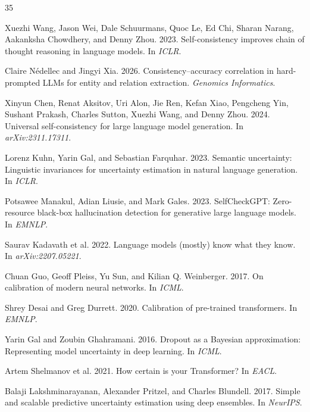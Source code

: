 \documentclass[11pt,a4paper]{article}
\begin{document}
\begin{thebibliography}{35}

Xuezhi Wang, Jason Wei, Dale Schuurmans, Quoc Le, Ed Chi, Sharan Narang, Aakanksha Chowdhery, and Denny Zhou. 2023.
Self-consistency improves chain of thought reasoning in language models.
In \emph{ICLR}.

Claire N\'{e}dellec and Jingyi Xia. 2026.
Consistency--accuracy correlation in hard-prompted LLMs for entity and relation extraction.
\emph{Genomics Informatics}.

Xinyun Chen, Renat Aksitov, Uri Alon, Jie Ren, Kefan Xiao, Pengcheng Yin, Sushant Prakash, Charles Sutton, Xuezhi Wang, and Denny Zhou. 2024.
Universal self-consistency for large language model generation.
In \emph{arXiv:2311.17311}.

Lorenz Kuhn, Yarin Gal, and Sebastian Farquhar. 2023.
Semantic uncertainty: Linguistic invariances for uncertainty estimation in natural language generation.
In \emph{ICLR}.

Potsawee Manakul, Adian Liusie, and Mark Gales. 2023.
SelfCheckGPT: Zero-resource black-box hallucination detection for generative large language models.
In \emph{EMNLP}.

Saurav Kadavath et al. 2022.
Language models (mostly) know what they know.
In \emph{arXiv:2207.05221}.

Chuan Guo, Geoff Pleiss, Yu Sun, and Kilian Q. Weinberger. 2017.
On calibration of modern neural networks.
In \emph{ICML}.

Shrey Desai and Greg Durrett. 2020.
Calibration of pre-trained transformers.
In \emph{EMNLP}.

Yarin Gal and Zoubin Ghahramani. 2016.
Dropout as a Bayesian approximation: Representing model uncertainty in deep learning.
In \emph{ICML}.

Artem Shelmanov et al. 2021.
How certain is your Transformer?
In \emph{EACL}.

Balaji Lakshminarayanan, Alexander Pritzel, and Charles Blundell. 2017.
Simple and scalable predictive uncertainty estimation using deep ensembles.
In \emph{NeurIPS}.


\end{thebibliography}
\end{document}
